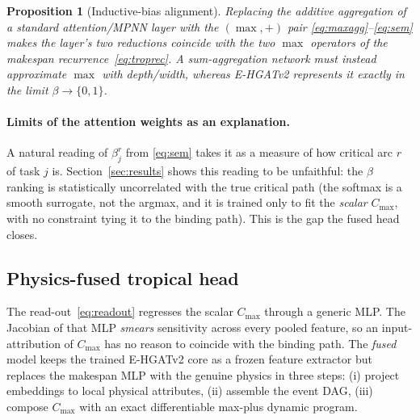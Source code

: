 \documentclass[11pt]{article}
\newtheorem{proposition}{Proposition}
\newcommand{\Cmax}{C_{\max}}
\begin{document}
\begin{proposition}[Inductive-bias alignment]
\label{prop:bias}
Replacing the additive aggregation of a standard attention/MPNN layer with the
$(\max,+)$ pair \eqref{eq:maxagg}--\eqref{eq:sem} makes the layer's two reductions coincide
with the two $\max$ operators of the makespan recurrence~\eqref{eq:troprec}. A
sum-aggregation network must instead \emph{approximate} $\max$ with depth/width, whereas
E-HGATv2 represents it exactly in the limit $\beta\!\to\!\{0,1\}$.
\end{proposition}

\paragraph{Limits of the attention weights as an explanation.} A natural reading of
$\beta^{r}_j$ from \eqref{eq:sem} takes it as a measure of how critical arc $r$ of task $j$
is. Section~\ref{sec:results} shows this reading to be unfaithful: the $\beta$ ranking is
statistically uncorrelated with the true critical path (the softmax is a smooth surrogate,
not the argmax, and it is trained only to fit the \emph{scalar} $\Cmax$, with no constraint
tying it to the binding path). This is the gap the fused head closes.

\subsection{Physics-fused tropical head}
\label{sec:fused}
The read-out~\eqref{eq:readout} regresses the scalar $\Cmax$ through a generic MLP. The
Jacobian of that MLP \emph{smears} sensitivity across every pooled feature, so an
input-attribution of $\Cmax$ has no reason to coincide with the binding path. The
\emph{fused} model keeps the trained E-HGATv2 core as a frozen feature extractor but
replaces the makespan MLP with the genuine physics in three steps: (i) project embeddings to
local physical attributes, (ii) assemble the event DAG, (iii) compose $\Cmax$ with an exact
differentiable max-plus dynamic program.
\end{document}
